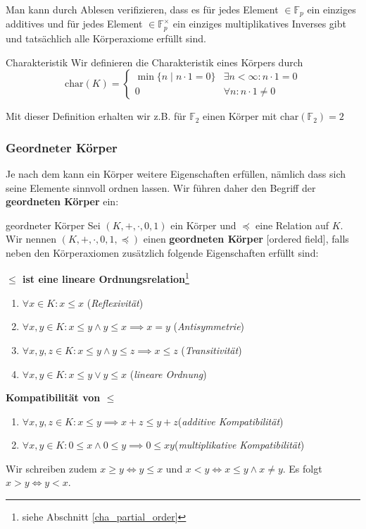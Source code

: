 \begin{example}
Man kann durch Ablesen verifizieren, dass es für jedes Element $\in \mathbb{F}_p$ ein einziges additives und für jedes Element $\in \mathbb{F}_p^\times$ ein einziges multiplikatives Inverses gibt und tatsächlich alle Körperaxiome erfüllt sind.
\end{example}

\begin{definition}{Charakteristik}{}
Wir definieren die Charakteristik eines Körpers durch
$$\text{char}(K) = \begin{cases} \min\{n \mid n \cdot 1 = 0\} & \exists n < \infty: n \cdot 1 = 0 \\ 0 & \forall n: n \cdot 1 \neq 0 \end{cases}$$
\end{definition}

\begin{remark}
Mit dieser Definition erhalten wir z.B. für $\mathbb{F}_2$ einen Körper mit $\text{char}(\mathbb{F}_2) = 2$
\end{remark}

\subsubsection{Geordneter Körper}\label{cha_ordered_field}

Je nach dem kann ein Körper weitere Eigenschaften erfüllen, nämlich dass sich seine Elemente sinnvoll ordnen lassen. Wir führen daher den Begriff der \textbf{geordneten Körper} ein:
\begin{definition}{geordneter Körper}{} Sei $(K, +, \cdot, 0, 1)$ ein Körper und $\preceq$ eine Relation auf $K$. Wir nennen $(K, +, \cdot, 0, 1, \preceq)$ einen \textbf{geordneten Körper} [ordered field], falls neben den Körperaxiomen zusätzlich folgende Eigenschaften erfüllt sind:

\textbf{$\leq$ ist eine lineare Ordnungsrelation}\footnote{siehe Abschnitt \ref{cha_partial_order}}
\begin{enumerate} [label=O\arabic*)]
    \item $\forall x \in K : x \leq x$ \hfill (\textit{Reflexivität})
    \item $\forall x,y \in K : x \leq y \land y \leq x \implies x = y$ \hfill (\textit{Antisymmetrie})
    \item $\forall x,y, z \in K : x \leq y \land y \leq z \implies x \leq z$ \hfill (\textit{Transitivität})
    \item $\forall x,y \in K : x \leq y \lor y \leq x$ \hfill (\textit{lineare Ordnung})
\end{enumerate}
\textbf{Kompatibilität von $\leq$}
\begin{enumerate} [resume, label=O\arabic*)]
    \item $\forall x,y,z \in K: x \leq y \implies x + z \leq y + z$\hfill (\textit{additive Kompatibilität})
    \item $\forall x,y \in K: 0 \leq x \land 0 \leq y \implies 0 \leq xy$\hfill (\textit{multiplikative Kompatibilität})
\end{enumerate}
Wir schreiben zudem $x\geq y \iff y \leq x$ und $x < y \iff x \leq y \land x \neq y$. Es folgt $x > y \iff y < x$.
\end{definition}

